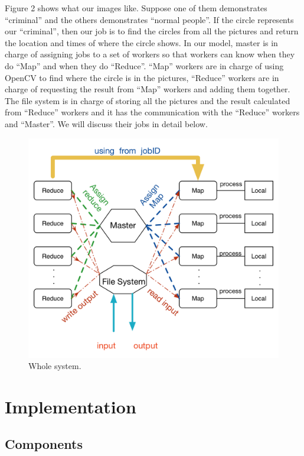 \documentclass[12pt]{article}
\begin{document}
Figure 2 shows what our images like. Suppose one of them demonstrates “criminal” and the others demonstrates “normal people”. If the circle represents our “criminal”, then our job is to find the circles from all the pictures and return the location and times of where the circle shows. In our model, master is in charge of assigning jobs to a set of workers so that workers can know when they do “Map” and when they do “Reduce”. “Map” workers are in charge of using OpenCV to find where the circle is in the pictures, “Reduce” workers are in charge of requesting the result from “Map” workers and adding them together. The file system is in charge of storing all the pictures and the result calculated from “Reduce” workers and it has the communication with the “Reduce” workers and “Master”. We will discuss their jobs in detail below.


\begin{figure}[h!]
  
  \centering
    \includegraphics[width=1\textwidth]{3.png}
    \caption{Whole system.}
\end{figure}

\section {Implementation}
\subsection{Components}
\end{document}
